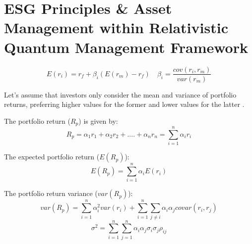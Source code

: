 \documentclass{article}
\begin{document}
\section{ESG Principles \& Asset Management within Relativistic Quantum Management Framework}
$$E(r_{i})=r_{f}+\beta_{i}(E(r_{m})-r_{f}) \quad \beta_{i}=\frac{cov(r_{i},r_{m})}{var(r_{m})}$$

Let's assume that investors only consider the mean and variance of portfolio returns, preferring higher values for the former and lower values for the latter \cite{elisaluciano}.

The portfolio return ($R_p$) is given by:
$$R_{p}=\alpha_{1}r_{1}+\alpha_{2}r_{2}+....+\alpha_{n}r_{n}=\sum_{i=1}^{n}\alpha_{i}r_{i}$$

The expected portfolio return ($E(R_p)$):
$$E(R_{p}) = \sum_{i=1}^{n}\alpha_{i}E(r_{i})$$

The portfolio return variance ($var(R_p)$):
$$var(R_{p}) = \sum_{i=1}^{n}\alpha_{i}^{2}var(r_{i})+\sum_{i=1}^{n}\sum_{j\ne i}\alpha_{i}\alpha_{j}covar(r_{i},r_{j})$$
$$ \sigma^{2}=\sum_{i=1}^{n}\sum_{j=1}^{n}\alpha_{i}\alpha_{j}\sigma_{i}\sigma_{j}\rho_{ij} $$
\end{document}
